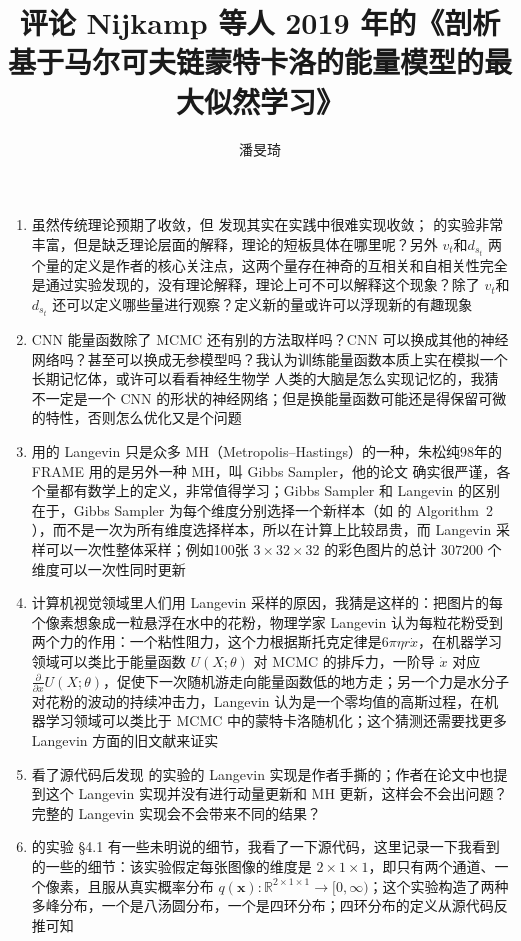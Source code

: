 \documentclass[11pt]{article}
\title{评论 Nijkamp 等人 2019 年的《剖析基于马尔可夫链蒙特卡洛的能量模型的最大似然学习》}
\author{潘旻琦}
\date{\zhtoday}
\begin{document}
\maketitle

\begin{enumerate}
\item 虽然传统理论预期了收敛，但 \cite{nijkamp2019anatomy} 发现其实在实践中很难实现收敛；\cite{nijkamp2019anatomy} 的实验非常丰富，但是缺乏理论层面的解释，理论的短板具体在哪里呢？另外 $v_t$和$d_{s_t}$ 两个量的定义是作者的核心关注点，这两个量存在神奇的互相关和自相关性完全是通过实验发现的，没有理论解释，理论上可不可以解释这个现象？除了 $v_t$和$d_{s_t}$ 还可以定义哪些量进行观察？定义新的量或许可以浮现新的有趣现象
\item CNN 能量函数除了 MCMC 还有别的方法取样吗？CNN 可以换成其他的神经网络吗？甚至可以换成无参模型吗？我认为训练能量函数本质上实在模拟一个长期记忆体，或许可以看看神经生物学
人类的大脑是怎么实现记忆的，我猜不一定是一个 CNN 的形状的神经网络；但是换能量函数可能还是得保留可微的特性，否则怎么优化又是个问题
\item \cite{nijkamp2019anatomy} 用的 Langevin 只是众多 MH（Metropolis–Hastings）的一种，朱松纯98年的 FRAME \cite{zhu1998filters} 用的是另外一种 MH，叫 Gibbs Sampler，他的论文 \cite{zhu1998filters} 确实很严谨，各个量都有数学上的定义，非常值得学习；Gibbs Sampler 和 Langevin 的区别在于，Gibbs Sampler 为每个维度分别选择一个新样本（如 \cite{zhu1998filters} 的 Algorithm~2  ），而不是一次为所有维度选择样本，所以在计算上比较昂贵，而 Langevin 采样可以一次性整体采样；例如100张 $3\times32\times32$ 的彩色图片的总计 $307200$ 个维度可以一次性同时更新
\item 计算机视觉领域里人们用 Langevin 采样的原因，我猜是这样的：把图片的每个像素想象成一粒悬浮在水中的花粉，物理学家 Langevin 认为每粒花粉受到两个力的作用：一个粘性阻力，这个力根据斯托克定律是$6\pi\eta r\dot{x}$，在机器学习领域可以类比于能量函数 $U(X;\theta)$ 对 MCMC 的排斥力，一阶导 $\dot{x}$ 对应 $\frac{\partial}{\partial x}U(X;\theta)$，促使下一次随机游走向能量函数低的地方走；另一个力是水分子对花粉的波动的持续冲击力，Langevin 认为是一个零均值的高斯过程，在机器学习领域可以类比于 MCMC 中的蒙特卡洛随机化；这个猜测还需要找更多 Langevin 方面的旧文献来证实
\item 看了源代码后发现 \cite{nijkamp2019anatomy} 的实验的 Langevin 实现是作者手撕的；作者在论文中也提到这个 Langevin 实现并没有进行动量更新和 MH 更新，这样会不会出问题？完整的 Langevin 实现会不会带来不同的结果？
\item \cite{nijkamp2019anatomy} 的实验 \S4.1 有一些未明说的细节，我看了一下源代码，这里记录一下我看到的一些的细节：该实验假定每张图像的维度是 $2\times1\times1$，即只有两个通道、一个像素，且服从真实概率分布 $q(\mathbf{x}): \mathbb{R}^{2\times1\times1}\to[0,\infty)$；这个实验构造了两种多峰分布，一个是八汤圆分布，一个是四环分布；四环分布的定义从源代码反推可知\begin{equation}\label{sihuanfenbu}

\end{equation}
\end{enumerate}
\end{document}
